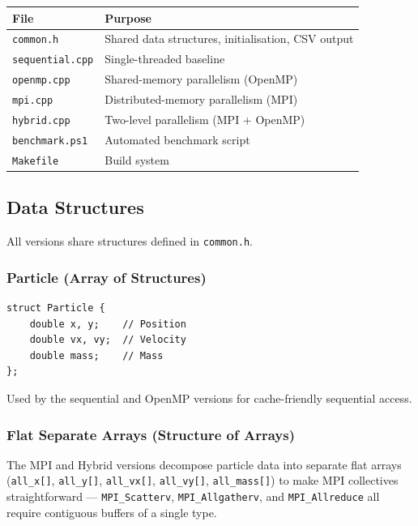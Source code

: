 ﻿\documentclass[12pt,a4paper]{article}
\begin{document}
\begin{center}
\begin{tabular}{ll}
    \toprule
    \textbf{File} & \textbf{Purpose} \\
    \midrule
    \texttt{common.h}      & Shared data structures, initialisation, CSV output \\
    \texttt{sequential.cpp} & Single-threaded baseline \\
    \texttt{openmp.cpp}    & Shared-memory parallelism (OpenMP) \\
    \texttt{mpi.cpp}       & Distributed-memory parallelism (MPI) \\
    \texttt{hybrid.cpp}    & Two-level parallelism (MPI + OpenMP) \\
    \texttt{benchmark.ps1} & Automated benchmark script \\
    \texttt{Makefile}      & Build system \\
    \bottomrule
\end{tabular}
\end{center}

\subsection{Data Structures}

All versions share structures defined in \texttt{common.h}.

\subsubsection*{Particle (Array of Structures)}

\begin{lstlisting}
struct Particle {
    double x, y;    // Position
    double vx, vy;  // Velocity
    double mass;    // Mass
};
\end{lstlisting}

Used by the sequential and OpenMP versions for cache-friendly sequential access.

\subsubsection*{Flat Separate Arrays (Structure of Arrays)}

The MPI and Hybrid versions decompose particle data into separate flat arrays
(\texttt{all\_x[]}, \texttt{all\_y[]}, \texttt{all\_vx[]}, \texttt{all\_vy[]},
\texttt{all\_mass[]}) to make MPI collectives straightforward ---
\texttt{MPI\_Scatterv}, \texttt{MPI\_Allgatherv}, and \texttt{MPI\_Allreduce}
all require contiguous buffers of a single type.
\end{document}
